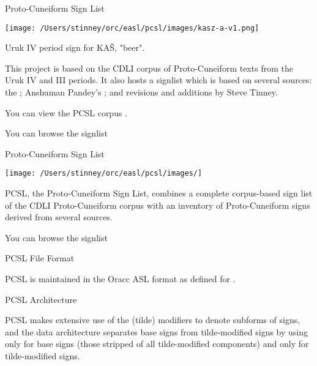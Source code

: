 \Hh{}Proto-Cuneiform Sign List

\bgroup\imagefloat{}\pc{}\texttt{[image: /Users/stinney/orc/easl/pcsl/images/kasz-a-v1.png]}\bgroup\imagecaption{}
\par Uruk IV period sign for KAŠ, "beer".

\egroup
\egroup

\par This project is based on the CDLI corpus of Proto-Cuneiform
      texts from the Uruk IV and III periods. It also hosts a
      signlist which is based on several sources: the ; Anshuman
      Pandey's ; and
      revisions and additions by Steve Tinney.


\par You can view the PCSL corpus .


\par You can browse the signlist 

\Hh{}Proto-Cuneiform Sign List

\bgroup\imageinline{}\texttt{[image: /Users/stinney/orc/easl/pcsl/images/]}\egroup

\par PCSL, the Proto-Cuneiform Sign List, combines a complete
      corpus-based sign list of the CDLI Proto-Cuneiform corpus with
      an inventory of Proto-Cuneiform signs derived from several
      sources.


\par You can browse the signlist 

\Hhhh{}PCSL File Format


\par PCSL is maintained in the Oracc ASL format as defined for
      .

\Hhhh{}PCSL Architecture


\par PCSL makes extensive use of the  (tilde) modifiers to denote subforms of
      signs, and the data architecture separates base signs from
      tilde-modified signs by using 
      only for base signs (those stripped of all tilde-modified
      components) and  only for
      tilde-modified signs.


